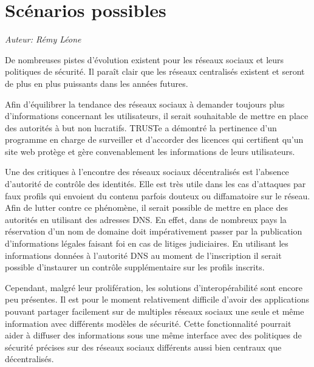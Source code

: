 \section{Scénarios possibles}

\begin{flushright}\textit{Auteur: Rémy Léone}\end{flushright}

De nombreuses pistes d'évolution existent pour les réseaux sociaux et leurs
politiques de sécurité. Il paraît clair que les réseaux centralisés existent et
seront de plus en plus puissants dans les années futures.

Afin d'équilibrer la tendance des réseaux sociaux à demander toujours plus
d'informations concernant les utilisateurs, il serait souhaitable de mettre en
place des autorités à but non lucratifs. TRUSTe a démontré la pertinence d'un
programme en charge de surveiller et d'accorder des licences qui certifient
qu'un site web protège et gère convenablement les informations de leurs
utilisateurs.

Une des critiques à l'encontre des réseaux sociaux décentralisés est l'absence
d'autorité de contrôle des identités. Elle est très utile dans les cas
d'attaques par faux profils qui envoient du contenu parfois douteux ou
diffamatoire sur le réseau. Afin de lutter contre ce phénomène, il serait
possible de mettre en place des autorités en utilisant des adresses DNS. En
effet, dans de nombreux pays la réservation d'un nom de domaine doit
impérativement passer par la publication d'informations légales faisant foi en
cas de litiges judiciaires. En utilisant les informations données à l'autorité
DNS au moment de l'inscription il serait possible d'instaurer un contrôle
supplémentaire sur les profils inscrits.

Cependant, malgré leur prolifération, les solutions d'interopérabilité sont
encore peu présentes. Il est pour le moment relativement difficile d'avoir des
applications pouvant partager facilement sur de multiples réseaux sociaux une
seule et même information avec différents modèles de sécurité. Cette
fonctionnalité pourrait aider à diffuser des informations sous une même
interface avec des politiques de sécurité précises sur des réseaux sociaux
différents aussi bien centraux que décentralisés.
